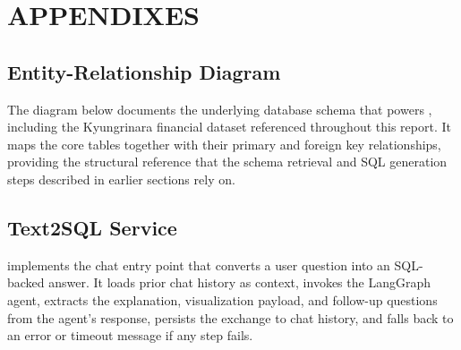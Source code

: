 \clearpage
\section{APPENDIXES}
\label{sec:appendixes}

\subsection{Entity-Relationship Diagram}
\label{sub:erm-diagram}

The diagram below documents the underlying database schema that powers
\projname{}, including the Kyungrinara financial dataset referenced
throughout this report. It maps the core tables together with their
primary and foreign key relationships, providing the structural
reference that the schema retrieval and SQL generation steps described
in earlier sections rely on.


\subsection{Text2SQL Service}
\label{sub:text2sql-service}

 implements the chat entry point that
converts a user question into an SQL-backed answer. It loads prior
chat history as context, invokes the LangGraph agent, extracts the
explanation, visualization payload, and follow-up questions from the
agent's response, persists the exchange to chat history, and falls
back to an error or timeout message if any step fails.


